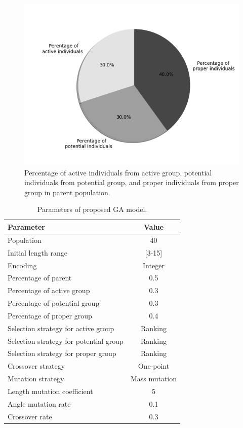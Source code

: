 \documentclass[10pt, journal]{IEEEtran}
\begin{document}
\begin{figure}[!tb]
	\centering
	\includegraphics[width=\linewidth]{percentage_of_groups}
	\caption{Percentage of active individuals from active group, potential
	  individuals from potential group, and proper individuals from proper group
	 in parent population.}
	 \label{fig:percentage}
\end{figure}

\begin{table}[!b]
\centering
\caption{Parameters of proposed GA model.}
\begin{adjustbox}{width=0.45\textwidth}
\label{tab:ga}
\begin{tabular}{lc}
\toprule
Parameter								&  Value  \\
\midrule
Population                              & 40        \\
Initial length range					& [3-15]    \\
Encoding								& Integer   \\
Percentage of parent                    & 0.5   \\
Percentage of active group				& 0.3   \\
Percentage of potential group			& 0.3   \\
Percentage of proper group				& 0.4   \\
Selection strategy for  active group	& Ranking   \\
Selection strategy for potential group	& Ranking   \\
Selection strategy for proper group	    & Ranking   \\
Crossover strategy			    		& One-point \\
Mutation strategy			    		& Mass mutation \\
Length mutation coefficient             & 5 \\
Angle mutation rate                     & 0.1 \\
Crossover rate                          & 0.3 \\
\bottomrule
\end{tabular}
\end{adjustbox}
\end{table}
\end{document}
